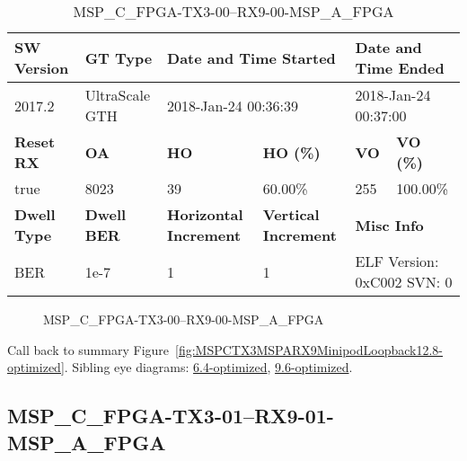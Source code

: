 \begin{table}[h]
\centering
\caption{MSP\_C\_FPGA-TX3-00--RX9-00-MSP\_A\_FPGA}
\label{tab:MSPCFPGATX300RX900MSPAFPGA12.8-optimized}
\begin{tabular}{@{}|l|l|l|l|l|l|@{}}
\toprule
\textbf{SW Version}                & \textbf{GT Type}   & \multicolumn{2}{l|}{\textbf{Date and Time Started}}            & \multicolumn{2}{l|}{\textbf{Date and Time Ended}}        \\ \midrule
2017.2                       & UltraScale GTH          & \multicolumn{2}{l|}{2018-Jan-24 00:36:39}                   & \multicolumn{2}{l|}{2018-Jan-24 00:37:00}               \\ \midrule
\textbf{Reset RX}                  & \textbf{OA} & \textbf{HO}   & \textbf{HO (\%)} & \textbf{VO} & \textbf{VO (\%)} \\ \midrule
true & 8023        & 39          & 60.00\%        & 255        & 100.00\%       \\ \midrule
\textbf{Dwell Type}                & \textbf{Dwell BER} & \textbf{Horizontal Increment} & \textbf{Vertical Increment}    & \multicolumn{2}{l|}{\textbf{Misc Info}}                  \\ \midrule
BER                            & 1e-7        & 1        & 1           & \multicolumn{2}{l|}{ELF Version: 0xC002 SVN: 0}                         \\ \bottomrule
\end{tabular}
\end{table}

\begin{figure}[h]
\caption{MSP\_C\_FPGA-TX3-00--RX9-00-MSP\_A\_FPGA} \label{fig:MSPCFPGATX300RX900MSPAFPGA12.8-optimized}
\end{figure}

Call back to summary Figure~\ref{fig:MSPCTX3MSPARX9MinipodLoopback12.8-optimized}.
Sibling eye diagrams: \hyperref[sec:MSPCFPGATX300RX900MSPAFPGA6.4-optimized]{6.4-optimized}, \hyperref[sec:MSPCFPGATX300RX900MSPAFPGA9.6-optimized]{9.6-optimized}.

\clearpage
\newpage


\subsection{MSP\_C\_FPGA-TX3-01--RX9-01-MSP\_A\_FPGA}\label{sec:MSPCFPGATX301RX901MSPAFPGA12.8-optimized}

